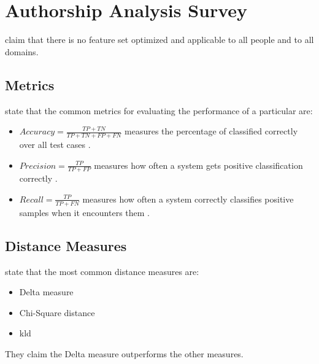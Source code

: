 \section{Authorship Analysis Survey}
\label{sec:authorship_analysis_survey}

\citet{elmanarelbouanani_authorship_2014} claim that there is no feature set optimized and applicable to all people and to all domains.

\subsection{Metrics}
\citet{elmanarelbouanani_authorship_2014} state that the common metrics for evaluating the performance of a particular are:
\begin{itemize}
    \item $Accuracy = \frac{TP + TN}{TP + TN + FP + FN}$ \citep{elmanarelbouanani_authorship_2014,neal_surveying_2018} 
    measures the percentage of classified correctly over all test cases \citep{neal_surveying_2018}.

    \item $Precision = \frac{TP}{TP + FP}$ \citep{elmanarelbouanani_authorship_2014,neal_surveying_2018} 
    measures how often a system gets positive classification correctly \citep{neal_surveying_2018}.

    \item $Recall = \frac{TP}{TP + FN}$ \citep{elmanarelbouanani_authorship_2014,neal_surveying_2018} 
    measures how often a system correctly classifies positive samples when it encounters them \citep{neal_surveying_2018}.
\end{itemize}


\subsection{Distance Measures}
\citet{elmanarelbouanani_authorship_2014} state that the most common distance measures are:
\begin{itemize}
    \item Delta measure
    \item Chi-Square distance
    \item \ac{kld}
\end{itemize}
They claim the Delta measure outperforms the other measures.